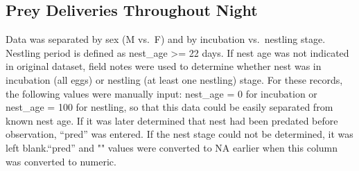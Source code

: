\documentclass[
]{article}
\begin{document}
\hypertarget{prey-deliveries-throughout-night}{%
\subsection{Prey Deliveries Throughout
Night}\label{prey-deliveries-throughout-night}}

Data was separated by sex (M vs.~F) and by incubation vs.~nestling
stage. Nestling period is defined as nest\_age \textgreater= 22 days. If
nest age was not indicated in original dataset, field notes were used to
determine whether nest was in incubation (all eggs) or nestling (at
least one nestling) stage. For these records, the following values were
manually input: nest\_age = 0 for incubation or nest\_age = 100 for
nestling, so that this data could be easily separated from known nest
age. If it was later determined that nest had been predated before
observation, ``pred'' was entered. If the nest stage could not be
determined, it was left blank.``pred'' and "" values were converted to
NA earlier when this column was converted to numeric.
\end{document}
